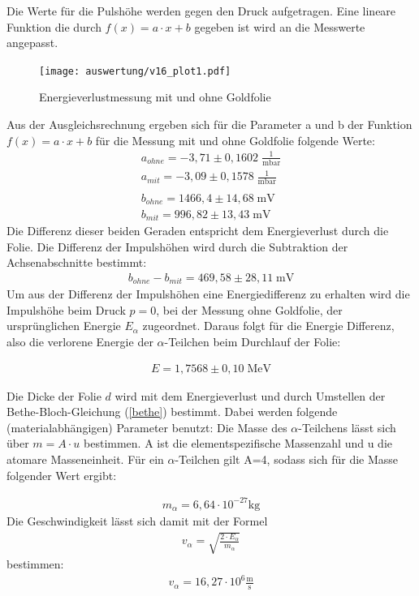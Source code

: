 Die Werte für die Pulshöhe werden gegen den Druck aufgetragen. Eine lineare Funktion die durch $f(x)=a\cdot x+b$ gegeben ist wird an die Messwerte angepasst.
\begin{figure}[h]
	\centering
	\texttt{[image: auswertung/v16\_plot1.pdf]}
	\caption{Energieverlustmessung mit und ohne Goldfolie}
	\label{img:grafik-dummy}
\end{figure}
\newpage
Aus der Ausgleichsrechnung ergeben sich für die Parameter a und b der Funktion $f(x)=a\cdot x+b$ für die Messung mit und ohne Goldfolie folgende Werte:
\begin{align*}
a_{ohne}= -3,71 \pm 0,1602 \; \frac{1}{\text{mbar}}
\\
a_{mit}= -3,09 \pm 0,1578 \; \frac{1}{\text{mbar}}
\\
\\
b_{ohne}= 1466,4 \pm 14,68 \; \text{mV}
\\
b_{mit}= 996,82 \pm  13,43 \; \text{mV}
\end{align*}
Die Differenz dieser beiden Geraden entspricht dem Energieverlust durch die Folie. Die Differenz der Impulshöhen wird durch die Subtraktion der Achsenabschnitte bestimmt:
\begin{align}
b_{ohne}-b_{mit}= 469,58 \pm 28,11 \; \text{mV}
\end{align}
Um aus der Differenz der Impulshöhen eine Energiedifferenz zu erhalten wird die Impulshöhe beim Druck $p=0$, bei der Messung ohne Goldfolie, der ursprünglichen Energie $E_\alpha$ zugeordnet. Daraus folgt für die Energie Differenz, also die verlorene Energie der $\alpha$-Teilchen beim Durchlauf der Folie:

\begin{align*}
 E= 1,7568 \pm 0,10\;  \text{MeV}
\end{align*}

Die Dicke der Folie $d$ wird mit dem Energieverlust und durch Umstellen der Bethe-Bloch-Gleichung (\ref{bethe}) bestimmt. Dabei werden folgende (materialabhängigen) Parameter benutzt: Die Masse des $\alpha$-Teilchens lässt sich über $m=A \cdot u$ bestimmen. A ist die elementspezifische Massenzahl und u die atomare Masseneinheit. Für ein $\alpha$-Teilchen gilt A=4, sodass sich für die Masse folgender Wert ergibt:

\begin{align*}
m_{\alpha}= 6,64 \cdot 10^{-27} \text{kg}
\end{align*}
Die Geschwindigkeit lässt sich damit mit der Formel
\begin{align*}
v_{\alpha}= \sqrt{\frac{2\cdot E_{\alpha}}{m_{\alpha}}}
\end{align*}
bestimmen:
\begin{align*}
v_{\alpha}=16,27 \cdot 10^{6} \frac{\text{m}}{\text{s}}
\end{align*}

